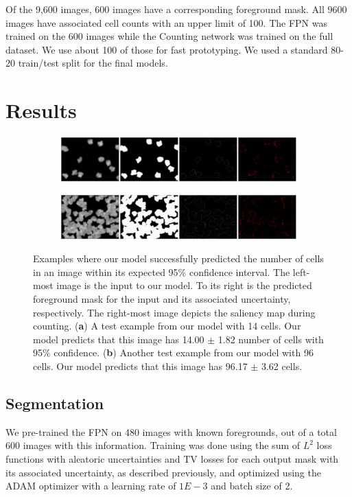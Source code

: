 \documentclass[10pt,twocolumn,letterpaper]{article}
\begin{document}
Of the 9,600 images, 600 images have a corresponding foreground mask. All 9600 images have associated cell counts with an upper limit of 100. The FPN was  trained on the 600 images while the Counting network was trained on the full dataset. We use about 100 of those for fast prototyping. We used a standard 80-20 train/test split for the final models.


\section{Results}

\begin{figure}[!h]
\centering
   \begin{subfigure}[b]{0.48\textwidth}
   \includegraphics[width=1.\textwidth]{good-1}
   \caption{}
   \label{fig_sal}
   \end{subfigure}

   \begin{subfigure}[b]{0.48\textwidth}
   \includegraphics[width=1.\textwidth]{good-2}
   \caption{}
   \label{fig_sal2}
   \end{subfigure}
\caption{Examples where our model successfully predicted the number of cells in an image within its expected 95\% confidence interval. The left-most image is the input to our model.
To its right is the predicted foreground mask for the input and its associated uncertainty, respectively.
The right-most image depicts the saliency map during counting. ({\bf a}) A test example from our model with 14 cells.
Our model predicts that this image has 14.00 $\pm$ 1.82 number of cells with 95\% confidence.
({\bf b}) Another test example from our model with 96 cells. Our model predicts that this image has 96.17 $\pm$ 3.62 cells.}
\label{fig_good}
\end{figure}


\subsection{Segmentation}
We pre-trained the FPN on 480 images with known foregrounds, out of a total 600 images with this information.
Training was done using the sum of $L^2$ loss functions with aleatoric uncertainties and TV losses for each output mask with its associated uncertainty, as described previously, and optimized using the ADAM optimizer with a learning rate of $1E-3$
and batch size of 2.
\end{document}
